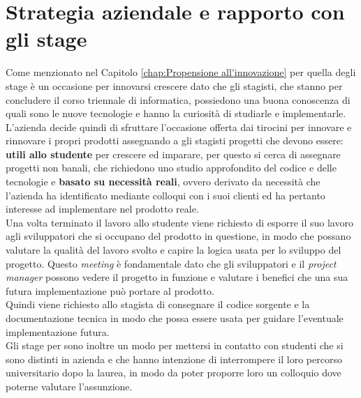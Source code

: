 \section{Strategia aziendale e rapporto con gli stage}\label{chap:strategia}
Come menzionato nel Capitolo \ref{chap:Propensione all'innovazione} per {\company} quella degli stage è un occasione 
per innovarsi crescere dato che gli stagisti, che stanno per concludere il corso triennale di informatica, possiedono una 
buona conoscenza di quali sono le nuove tecnologie e hanno la curiosità di studiarle e implementarle.\\
L'azienda decide quindi di sfruttare l'occasione offerta dai tirocini per innovare e rinnovare i propri prodotti 
assegnando a gli stagisti progetti che devono essere: 
\textbf{utili allo studente} per crescere ed imparare, per questo 
si cerca di assegnare progetti non banali, che richiedono uno studio approfondito del codice e delle tecnologie e 
\textbf{basato su necessità reali}, ovvero derivato da 
necessità che l'azienda ha identificato mediante colloqui con i suoi clienti ed ha pertanto 
interesse ad implementare nel prodotto reale.\\
Una volta terminato il lavoro allo studente viene richiesto di esporre il suo lavoro agli sviluppatori che si occupano 
del prodotto in questione, in modo che possano valutare la qualità del lavoro svolto e capire la logica usata per lo sviluppo 
del progetto. Questo \textit{meeting} è fondamentale dato che gli sviluppatori e il \textit{project manager} possono 
vedere il progetto in funzione e valutare i benefici che una sua futura implementazione può portare al prodotto.\\
Quindi viene richiesto allo stagista di consegnare il codice sorgente e la documentazione tecnica in modo che possa essere usata per guidare 
l'eventuale implementazione futura.\\
Gli stage per {\company} sono inoltre un modo per mettersi in contatto con studenti che si sono distinti in azienda e che hanno 
intenzione di interrompere il loro percorso universitario dopo la laurea, in modo da poter proporre loro un colloquio 
dove poterne valutare l'assunzione.